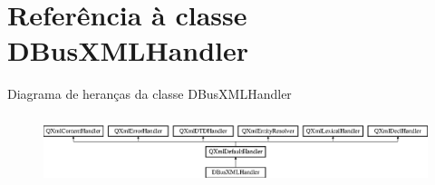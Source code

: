 \hypertarget{class_d_bus_x_m_l_handler}{\section{Referência à classe D\-Bus\-X\-M\-L\-Handler}
\label{class_d_bus_x_m_l_handler}
}
Diagrama de heranças da classe D\-Bus\-X\-M\-L\-Handler\begin{figure}[H]
\begin{center}
\leavevmode
\includegraphics[height=2.014389cm]{class_d_bus_x_m_l_handler}
\end{center}
\end{figure}
